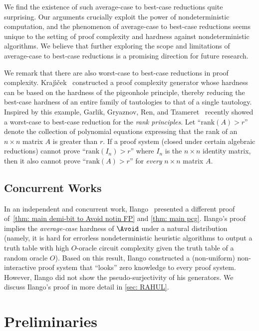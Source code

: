 \documentclass[10pt,a4paper]{article}
\theoremstyle{definition}
\theoremstyle{remark}
\newcommand{\Krajicek}{Kraj\'{\i}\v{c}ek\xspace}
\begin{document}
We find the existence of such average-case to best-case reductions quite surprising. Our arguments crucially exploit the power of nondeterministic computation, and the phenomenon of average-case to best-case reductions seems unique to the setting of proof complexity and hardness against nondeterministic algorithms. We believe that further exploring the scope and limitations of average-case to best-case reductions is a promising direction for future research.

\def\rank{\mathrm{rank}}
We remark that there are also worst-case to best-case reductions in proof complexity. \Krajicek~\cite{krajicek2007proof} constructed a proof complexity generator whose hardness can be based on the hardness of the pigeonhole principle, thereby reducing the best-case hardness of an entire family of tautologies to that of a single tautology. Inspired by this example, Garlik, Gryaznov, Ren, and Tzameret~\cite{GGRT25} recently showed a worst-case to best-case reduction for the \emph{rank principles}. Let ``$\rank(A) > r$'' denote the collection of polynomial equations expressing that the rank of an $n\times n$ matrix $A$ is greater than $r$. If a proof system (closed under certain algebraic reductions) cannot prove ``$\rank(I_n) > r$'' where $I_n$ is the $n\times n$ identity matrix, then it also cannot prove ``$\rank(A) > r$'' for \emph{every} $n\times n$ matrix $A$.



\subsection{Concurrent Works}
In an independent and concurrent work, Ilango~\cite{Ilango25} presented a different proof of~\autoref{thm: main demi-bit to Avoid notin FP} and \autoref{thm: main pcg}. Ilango's proof implies the \emph{average-case} hardness of $\Avoid$ under a natural distribution (namely, it is hard for errorless nondeterministic heuristic algorithms to output a truth table with high $O$-oracle circuit complexity given the truth table of a random oracle $O$). Based on this result, Ilango constructed a (non-uniform) non-interactive proof system that ``looks'' zero knowledge to every proof system. However, Ilango did not show the pseudo-surjectivity of his generators. We discuss Ilango's proof in more detail in \autoref{sec: RAHUL}.


\section{Preliminaries}\label{sec: preliminaries}
\end{document}
